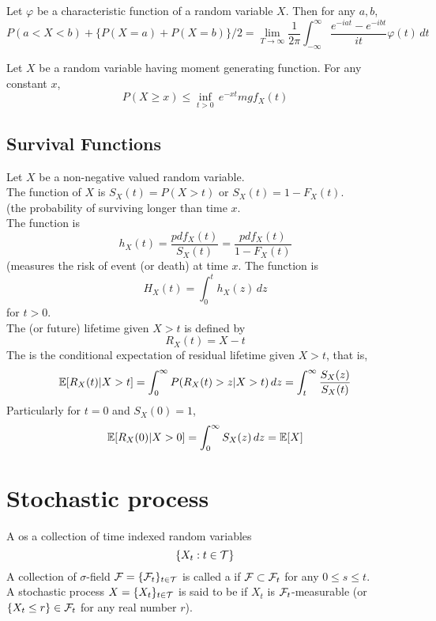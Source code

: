 \documentclass[11pt]{article}
\begin{document}
Let $\varphi$ be a characteristic function of a random variable $X$. Then for any $a, b$,
$$P(a < X < b) + \{P(X=a) + P(X=b)\}/2 = \underset{T \rightarrow \infty}{\lim} \frac{1}{2\pi} \int_{-\infty}^\infty \frac{e^{-iat} - e^{-ibt}}{it} \varphi(t) \, dt$$

Let $X$ be a random variable having moment generating function. For any constant $x$,
$$P(X \geq x) \leq \underset{t > 0}{\inf}\,e^{-xt}mgf_X(t)$$

\subsection{Survival Functions}
Let $X$ be a non-negative valued random variable. \\
The  function of $X$ is $S_X(t) = P(X > t)$ or $S_X(t) = 1 - F_X(t)$. \\
(the probability of surviving longer than time $x$.\\
The  function is
$$h_X(t) = \frac{pdf_X(t)}{S_X(t)} = \frac{pdf_X(t)}{1-F_X(t)}$$
(measures the risk of event (or death) at time $x$.
The  function is
$$H_X(t) = \int_0^t h_X(z) \, dz$$ for $t > 0$. \\
The  (or future) lifetime given $X > t$ is defined by
$$R_X(t) = X - t$$
The  is the conditional expectation of residual lifetime given $X > t$, that is,
\begin{align}
	\mathbb{E}[{R_X(t) | X > t}] = \int_0^\infty P(R_X(t) > z |X > t)\, dz = \int_t^\infty \frac{S_X(z)}{S_X(t)}
\end{align}
Particularly for $t = 0$ and $S_X(0) = 1$,
$$\mathbb{E}[{R_X(0)|X>0}] = \int_0^\infty S_X(z) \, dz = \mathbb{E}[{X}]$$

\section{Stochastic process}
A  os a collection of time indexed random variables $$\{X_t: t \in \mathcal{T}\}$$
A collection of $\sigma$-field $\mathcal{F} = \{\mathcal{F}_t\}_{t \in \mathcal{T}}$ is called a  if $\mathcal{F} \subset \mathcal{F}_t$ for any $0 \leq s \leq t$. \\
A stochastic process $X = \{X_t\}_{t \in \mathcal{T}}$ is said to be  if $X_t$ is $\mathcal{F}_t$-measurable (or $\{X_t \leq r\} \in \mathcal{F}_t$ for any real number $r$).
\end{document}
